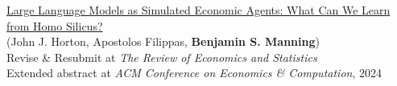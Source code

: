 \documentclass[margin,line,pifont,palatino,courier, 9pt]{res}
\begin{document}
\begin{resume}

\href{https://www.nber.org/papers/w31122}{Large Language Models as Simulated Economic Agents: What Can We Learn from Homo Silicus?}\\
(John J. Horton\footnotemark[\value{footnote}], Apostolos Filippas\footnotemark[\value{footnote}], \textbf{Benjamin S. Manning}\footnotemark[\value{footnote}])\\
Revise \& Resubmit at \textit{The Review of Economics and Statistics}\\
Extended abstract at \textit{ACM Conference on Economics \& Computation}, 2024



\end{resume}
\end{document}

